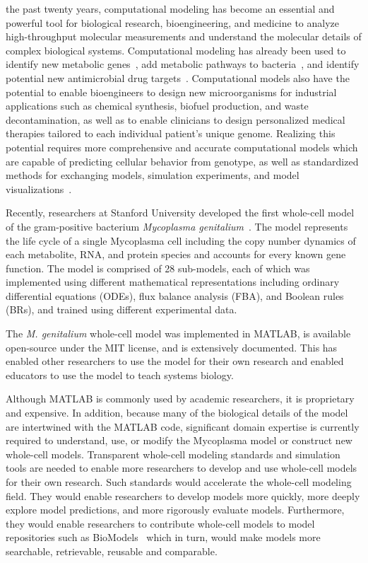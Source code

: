 \documentclass[journal,transmag]{IEEEtran}
\begin{document}
 the past twenty years, computational modeling has become an essential and powerful tool for biological research, bioengineering, and medicine to analyze high-throughput molecular measurements and understand the molecular details of complex biological systems. 
Computational modeling has already been used to identify new metabolic genes~\cite{Reed2006}, add metabolic pathways to bacteria~\cite{Lee2009}, and identify potential new antimicrobial drug targets~\cite{Lee2012}. 
Computational models also have the potential to enable bioengineers to design new microorganisms for industrial applications such as chemical synthesis, biofuel production, and waste decontamination, as well as to enable clinicians to design personalized medical therapies tailored to each individual patient's unique genome. 
Realizing this potential requires more comprehensive and accurate computational models which are capable of predicting cellular behavior from genotype, as well as standardized methods for exchanging models, simulation experiments, and model visualizations~\cite{Macklin2014,Karr2015,hucka2015promoting,Klipp07}.

Recently, researchers at Stanford University developed the first whole-cell model of the gram-positive bacterium \textit{Mycoplasma genitalium}~\cite{Karr2012}. 
The model represents the life cycle of a single Mycoplasma cell including the copy number dynamics of each metabolite, RNA, and protein species and accounts for every known gene function. 
The model is comprised of 28 sub-models, each of which was implemented using different mathematical representations including ordinary differential equations (ODEs), flux balance analysis (FBA), and Boolean rules (BRs), and trained using different experimental data. 

The \textit{M. genitalium} whole-cell model was implemented in MATLAB, is available open-source under the MIT license, and is extensively documented. 
This has enabled other researchers to use the model for their own research and enabled educators to use the model to teach systems biology. 

Although MATLAB is commonly used by academic researchers, it is proprietary and expensive. In addition, because many of the biological details of the model are intertwined with the MATLAB code, significant domain expertise is currently required to understand, use, or modify the Mycoplasma model or construct new whole-cell models. 
Transparent whole-cell modeling standards and simulation tools are needed to enable more researchers to develop and use whole-cell models for their own research. 
Such standards would accelerate the whole-cell modeling field. They would enable researchers to develop models more quickly, more deeply explore model predictions, and more rigorously evaluate models. Furthermore, they would enable researchers to contribute whole-cell models to model repositories such as BioModels~\cite{li2010biomodels} which in turn, would make models more searchable, retrievable, reusable and comparable.
\end{document}
